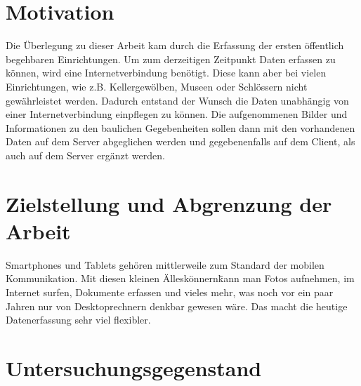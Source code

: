 \section{Motivation}
\label{sec:motivation:mot}

Die Überlegung zu dieser Arbeit kam durch die Erfassung der ersten öffentlich begehbaren Einrichtungen. Um zum derzeitigen Zeitpunkt Daten erfassen zu können, wird eine Internetverbindung benötigt. Diese kann aber bei vielen Einrichtungen, wie z.B. Kellergewölben, Museen oder Schlössern nicht gewährleistet werden. Dadurch entstand der Wunsch die Daten unabhängig von einer Internetverbindung einpflegen zu können. Die aufgenommenen Bilder und Informationen zu den baulichen Gegebenheiten sollen dann mit den vorhandenen Daten auf dem Server abgeglichen werden und gegebenenfalls auf dem Client, als auch auf dem Server ergänzt werden.

\section{Zielstellung und Abgrenzung der Arbeit}
\label{sec:goal:goal}

Smartphones und Tablets gehören mittlerweile zum Standard der mobilen Kommunikation. Mit diesen kleinen \"Alleskönnern\" kann man Fotos aufnehmen, im Internet surfen, Dokumente erfassen und vieles mehr, was noch vor ein paar Jahren nur von Desktoprechnern denkbar gewesen wäre. Das macht die heutige Datenerfassung sehr viel flexibler.

\section{Untersuchungsgegenstand}
\label{sec:investigation:inv}
